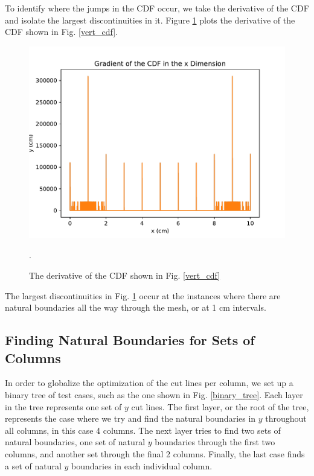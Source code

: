 To identify where the jumps in the CDF occur, we take the derivative of the CDF and isolate the largest discontinuities in it. Figure \ref{gradcdf} plots the derivative of the CDF shown in Fig. \ref{vert_cdf}. 
\begin{figure}[h]
\centering
\includegraphics[scale=0.75]{../figures/gradcdf.pdf}
\caption{The derivative of the CDF shown in Fig. \ref{vert_cdf}}.
\label{gradcdf}
\end{figure}
The largest discontinuities in Fig. \ref{gradcdf} occur at the instances where there are natural boundaries all the way through the mesh, or at 1 cm intervals.

\FloatBarrier
\subsection{Finding Natural Boundaries for Sets of Columns}
In order to globalize the optimization of the cut lines per column, we set up a binary tree of test cases, such as the one shown in Fig. \ref{binary_tree}. Each layer in the tree represents one set of $y$ cut lines. The first layer, or the root of the tree, represents the case where we try and find the natural boundaries in $y$ throughout all columns, in this case 4 columns. The next layer tries to find two sets of natural boundaries, one set of natural $y$ boundaries through the first two columns, and another set through the final 2 columns. Finally, the last case finds a set of natural $y$ boundaries in each individual column.

